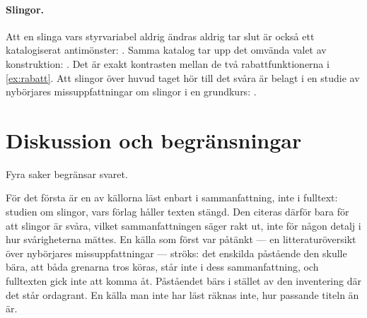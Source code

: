 \paragraph{Slingor.}  Att en slinga vars styrvariabel aldrig ändras
aldrig tar slut är också ett katalogiserat antimönster:
.
Samma katalog tar upp det omvända valet av konstruktion:
.  Det är exakt kontrasten
mellan de två rabattfunktionerna i \cref{ex:rabatt}.  Att
slingor över huvud taget hör till det svåra är belagt i en studie av
nybörjares missuppfattningar om slingor i en grundkurs:
.


\section{Diskussion och begränsningar}
\label{sec:cond-diskussion}

Fyra saker begränsar svaret.

För det första är en av källorna läst enbart i sammanfattning, inte i
fulltext: studien om slingor, vars förlag håller texten stängd.  Den
citeras därför bara för att slingor är svåra, vilket sammanfattningen
säger rakt ut, inte för någon detalj i hur svårigheterna mättes.  En
källa som först var påtänkt --- en litteraturöversikt över nybörjares
missuppfattningar --- ströks: det enskilda påstående den skulle bära, att
båda grenarna tros köras, står inte i dess sammanfattning, och
fulltexten gick inte att komma åt.  Påståendet bärs i stället av den
inventering där det står ordagrant.  En källa man inte har läst räknas
inte, hur passande titeln än är.

